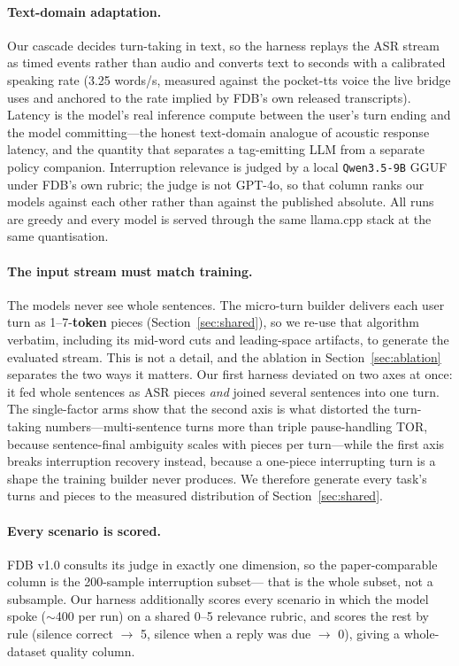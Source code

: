 \documentclass[conference]{IEEEtran}
\begin{document}
\paragraph{Text-domain adaptation.} Our cascade decides turn-taking in text, so
the harness replays the ASR stream as timed events rather than audio and converts
text to seconds with a calibrated speaking rate (3.25 words/s, measured against
the pocket-tts voice the live bridge uses and anchored to the rate implied by
FDB's own released transcripts). Latency is the model's real inference compute
between the user's turn ending and the model committing---the honest text-domain
analogue of acoustic response latency, and the quantity that separates a
tag-emitting LLM from a separate policy companion. Interruption relevance is
judged by a local \texttt{Qwen3.5-9B} GGUF under FDB's own rubric; the judge is
not GPT-4o, so that column ranks our models against each other rather than against
the published absolute. All runs are greedy and every model is served through the
same llama.cpp stack at the same quantisation.

\paragraph{The input stream must match training.} The models never see whole
sentences. The micro-turn builder delivers each user turn as 1--7-\textbf{token}
pieces (Section~\ref{sec:shared}), so we re-use that algorithm verbatim, including
its mid-word cuts and leading-space artifacts, to generate the evaluated stream.
This is not a detail, and the ablation in Section~\ref{sec:ablation} separates the
two ways it matters. Our first harness deviated on two axes at once: it fed whole
sentences as ASR pieces \emph{and} joined several sentences into one turn. The
single-factor arms show that the second axis is what distorted the turn-taking
numbers---multi-sentence turns more than triple pause-handling TOR, because
sentence-final ambiguity scales with pieces per turn---while the first axis breaks
interruption recovery instead, because a one-piece interrupting turn is a shape the
training builder never produces. We therefore generate every task's turns and pieces
to the measured distribution of Section~\ref{sec:shared}.

\paragraph{Every scenario is scored.} FDB v1.0 consults its judge in exactly one
dimension, so the paper-comparable column is the 200-sample interruption subset---
that is the whole subset, not a subsample. Our harness additionally scores every
scenario in which the model spoke ($\sim$400 per run) on a shared 0--5 relevance
rubric, and scores the rest by rule (silence correct $\rightarrow$ 5, silence when
a reply was due $\rightarrow$ 0), giving a whole-dataset quality column.
\end{document}
